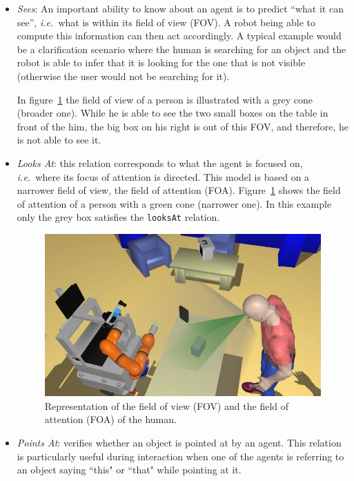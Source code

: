 \documentclass[twocolumn]{svjour3}
\newcommand{\concept}[1]{{\footnotesize \texttt{#1}}}
\newcommand{\ie}{{\textit{i.e.~}}}
\begin{document}
\begin{itemize}

\item \emph{Sees}: An important ability to know about an agent is to predict
``what it can see'', \ie what is within its field of view (FOV). A robot being
able to compute this information can then act accordingly. A typical example
would be a clarification scenario where the human is searching for an object
and the robot is able to infer that it is looking for the one that is not
visible (otherwise the user would not be searching for it).

In figure~\ref{fig::vis} the field of view of a person is illustrated with a
grey cone (broader one). While he is able to see the two small boxes on the
table in front of the him, the big box on his right is out of this FOV, and
therefore, he is not able to see it. 

\item \emph{Looks At}: this relation corresponds to what the agent is focused
on, \ie where its focus of attention is directed. This model is based on a
narrower field of view, the field of attention (FOA). Figure~\ref{fig::vis}
shows the field of attention of a person with a green cone (narrower one). In
this example only the grey box satisfies the \concept{looksAt} relation.

\begin{figure}[!t] \centering
\includegraphics[width=\columnwidth]{images/looks.jpg} \caption{Representation
of the field of view (FOV) and the field of attention (FOA) of the human.}
\label{fig::vis} \end{figure}

\item \emph{Points At}: verifies whether an object is pointed at by an agent. This
relation is particularly useful during interaction when one of the agents is
referring to an object saying ``this" or ``that" while pointing at it. 
 

\end{itemize}
\end{document}
